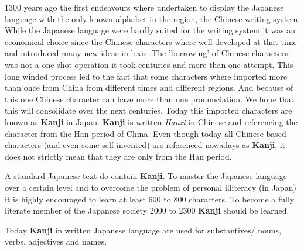

1300 years ago the first endeavours where undertaken to display the Japanese
language with the only known alphabet in the region, the Chinese writing
system. While the Japanese language were hardly suited for the writing system
it was an economical choice since the Chinese characters where well developed
at that time and introduced many new ideas in lexis. The 'borrowing' of Chinese
characters was not a one shot operation it took centuries and more than one
attempt. This long winded process led to the fact that some characters where
imported more than once from China from different times and different regions.
And because of this one Chinese character can have more than one pronunciation.
We hope that this will consolidate over the next centuries. Today this imported
characters are known as \textbf{Kanji} in Japan. \textbf{Kanji} is written
\textit{Hanzi} in Chinese and referencing the character from the Han period of
China. Even though today all Chinese based characters (and even some self
invented) are referenced nowadays as \textbf{Kanji}, it does not strictly mean
that they are only from the Han period.

A standard Japanese text do contain \textbf{Kanji}. To master the Japanese
language over a certain level and to overcome the problem of personal
illiteracy (in Japan) it is highly encouraged to learn at least 600 to 800
characters. To become a fully literate member of the Japanese society 2000 to
2300 \textbf{Kanji} should be learned.

Today \textbf{Kanji} in written Japanese language are used for substantives/
nouns, verbs, adjectives and names.

